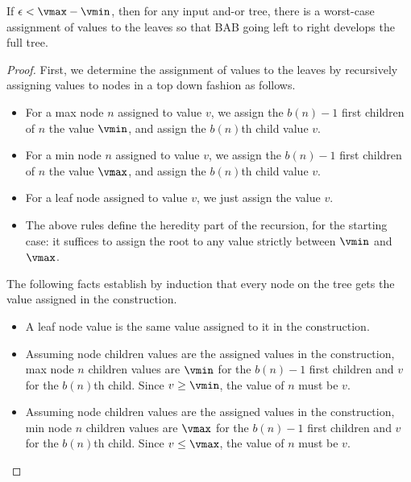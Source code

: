 







\begin{theorem}
If $\epsilon < \vmax - \vmin$, then for any input and-or tree, there is a worst-case assignment of values to the leaves so that BAB going left to right develops the full tree.
\label{the:worst}
\end{theorem}
\begin{proof}
First, we determine the assignment of values to the leaves by recursively assigning values to nodes in a top down fashion as follows.

\begin{itemize}
  \item For a max node $n$ assigned to value $v$, we assign the $b(n)-1$ first children of $n$ the value $\vmin$, and assign the $b(n)$th child value $v$.
  \item For a min node $n$ assigned to value $v$, we assign the $b(n)-1$ first children of $n$ the value $\vmax$, and assign the $b(n)$th child value $v$.
  \item For a leaf node assigned to value $v$, we just assign the value $v$.
  \item The above rules define the heredity part of the recursion, for the starting case: it suffices to assign the root to any value strictly between $\vmin$ and $\vmax$.
\end{itemize}

The following facts establish by induction that every node on the tree gets the value assigned in the construction.
\begin{itemize}
  \item A leaf node value is the same value assigned to it in the construction.  
  \item Assuming node children values are the assigned values in the construction, max node $n$ children values are $\vmin$ for the $b(n)-1$ first children and $v$ for the $b(n)$th child. Since $v \geq \vmin$, the value of $n$ must be $v$.
    \item Assuming node children values are the assigned values in the construction, min node $n$ children values are $\vmax$ for the $b(n)-1$ first children and $v$ for the $b(n)$th child. Since $v \leq \vmax$, the value of $n$ must be $v$.
\end{itemize}


\end{proof}
